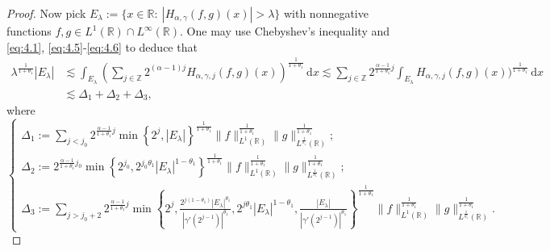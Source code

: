 \documentclass[11pt, twoside, leqno]{article}
\theoremstyle{definition}
\numberwithin{equation}{section}
\begin{document}
\begin{proof}
Now pick $E_{\lambda}:=\{x\in{\mathbb{R}}:\ |H_{\alpha,\gamma}(f,g)(x)|>\lambda\}$ with nonnegative functions $f, g \in L^1(\mathbb{R}) \cap L^{\infty}(\mathbb{R})$. One may use Chebyshev's inequality and \eqref{eq:4.1}, \eqref{eq:4.5}-\eqref{eq:4.6} to deduce that
\begin{align}\label{eq:4.8}
 \lambda^{\frac{1}{1+\theta_{1}}}|E_{\lambda}|&\lesssim \int_{E_{\lambda}}\left(\sum\limits_{j\in\mathbb{Z}}2^{(\alpha-1)j}H_{\alpha,\gamma,j}(f,g)(x)\right)^{\frac{1}{1+\theta_{1}}}\,\textrm{d}x
\lesssim\sum\limits_{j\in\mathbb{Z}}2^{{\frac{\alpha-1}{1+\theta_{1}}}j}\int_{E_{\lambda}}H_{\alpha,\gamma,j}(f,g)(x))^{\frac{1}{1+\theta_{1}}}\,\textrm{d}x\\ \nonumber
&\lesssim \Delta_{1}+\Delta_{2}+\Delta_{3},
  \end{align}
where
$$\begin{cases}
   \Delta_{1}:=\sum\limits_{j<j_{0}}2^{{\frac{\alpha-1}{1+\theta_{1}}j}}\min\left\{2^j,|E_\lambda|\right\}^{\frac{1}{1+\theta_{1}}}
\|f\|_{L^{1}(\mathbb{R})}^{\frac{1}{1+\theta_{1}}}\|g\|_{L^{\frac{1}{\theta_1}}(\mathbb{R})}^{\frac{1}{1+\theta_{1}}}; \\
   \Delta_{2}:=2^{{\frac{\alpha-1}{1+\theta_{1}}}j_{0}}\min\left\{2^{j_0},2^{{j_0}\theta_{1}}|E_\lambda|^{1-\theta_{1}}\right\}^{\frac{1}{1+\theta_{1}}}\|f\|_{L^{1}(\mathbb{R})}^{\frac{1}{1+\theta_{1}}}\|g\|_{L^{\frac{1}{\theta_1}}(\mathbb{R})}^{\frac{1}{1+\theta_{1}}};\\
 \Delta_{3}:=\sum\limits_{j>j_{0}+2}2^{{\frac{\alpha-1}{1+\theta_{1}}}j}\min\left\{2^j,\frac{2^{j(1-\theta_{1})}|E_\lambda|^{\theta_1}}{|\gamma'(2^{j-1})|^{\theta_{1}}},2^{j\theta_1} |E_\lambda|^{1-\theta_1},\frac{|E_\lambda|}{|\gamma'(2^{j-1})|^{\theta_1}}\right\}^{\frac{1}{1+\theta_{1}}}\|f\|_{L^{1}(\mathbb{R})}^{\frac{1}{1+\theta_{1}}}\|g\|_{L^{\frac{1}{\theta_1}}(\mathbb{R})}^{\frac{1}{1+\theta_{1}}}.
 \end{cases}$$


\end{proof}
\end{document}

